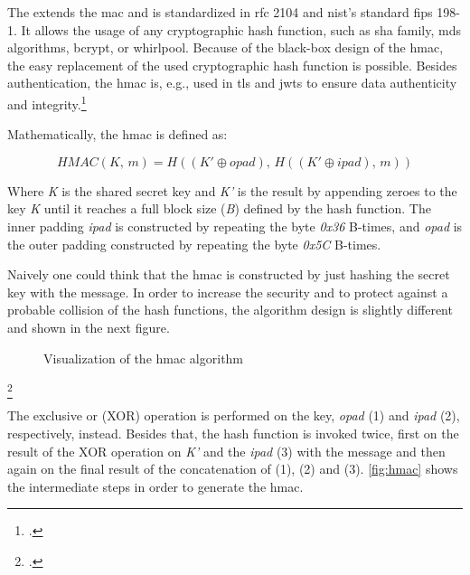 The  extends the \gls{mac} and is standardized in \gls{rfc} 2104 and \gls{nist}'s standard \gls{fips} 198-1. It allows the usage of any cryptographic hash function, such as \gls{sha} family, \glspl{md} algorithms, bcrypt, or whirlpool. Because of the black-box design of the \gls{hmac}, the easy replacement of the used cryptographic hash function is possible. Besides authentication, the \gls{hmac} is, e.g., used in \gls{tls} and \glspl{jwt} to ensure data authenticity and integrity.\footcites[See][]{krawczyk1997rfc}[See][]{FIPS198}[See][14]{rfc5246}[See][8]{rfc7519}[See][3--4]{s2011rfc}

Mathematically, the \gls{hmac} is defined as:

\begin{equation*}
	HMAC(K,\, m) = H((K' \oplus opad),\, H((K' \oplus ipad),\, m))
\end{equation*}

Where \textit{K} is the shared secret key and \textit{K'} is the result by appending zeroes to the key \textit{K} until it reaches a full block size (\textit{B}) defined by the hash function. The inner padding \textit{ipad} is constructed by repeating the byte \textit{0x36} B-times, and \textit{opad} is the outer padding constructed by repeating the byte \textit{0x5C} B-times.

Naively one could think that the \gls{hmac} is constructed by just hashing the secret key with the message. In order to increase the security and to protect against a probable collision of the hash functions, the algorithm design is slightly different and shown in the next figure.

\begin{figure}[hbt]
	\centering
	
	\caption[Visualization of the \gls{hmac} algorithm]{Visualization of the \gls{hmac} algorithm\footnotemark}
	\label{fig:hmac}
\end{figure}
\footcitetext[Source: diagram by author, based on][395]{eckert-it-sec-9}

The exclusive or (XOR) operation is performed on the key, \textit{opad} (1) and \textit{ipad} (2), respectively, instead. Besides that, the hash function is invoked twice, first on the result of the XOR operation on \textit{K'} and the \textit{ipad} (3) with the message and then again on the final result of the concatenation of (1), (2) and (3). \autoref{fig:hmac} shows the intermediate steps in order to generate the \gls{hmac}.


